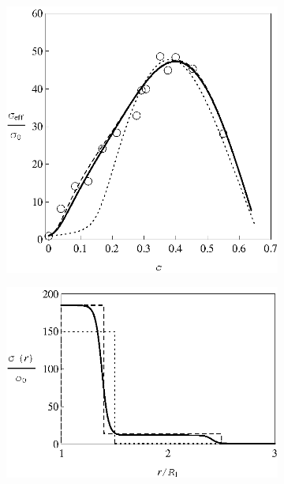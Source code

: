 \documentclass[twoside,a4paper,14pt]{vakaref}
\begin{document}
\begin{figure}[tb]
	\centering
	\begin{subfigure}[c]{0.45\textwidth}
		\includegraphics[width=\textwidth]{Fig12_Liang_LiI-Al2O3-Processing.eps}
		\caption{} \label{fig:Liang_LiI-Al2O3-Processing-a}
	\end{subfigure}%
	\quad
	\begin{subfigure}[c]{0.35\textwidth}
		\includegraphics[width=\textwidth]{Fig13_Liang_LiI-Al2O3-Profile.eps}\\ 

\end{subfigure}
\end{figure}
\end{document}
